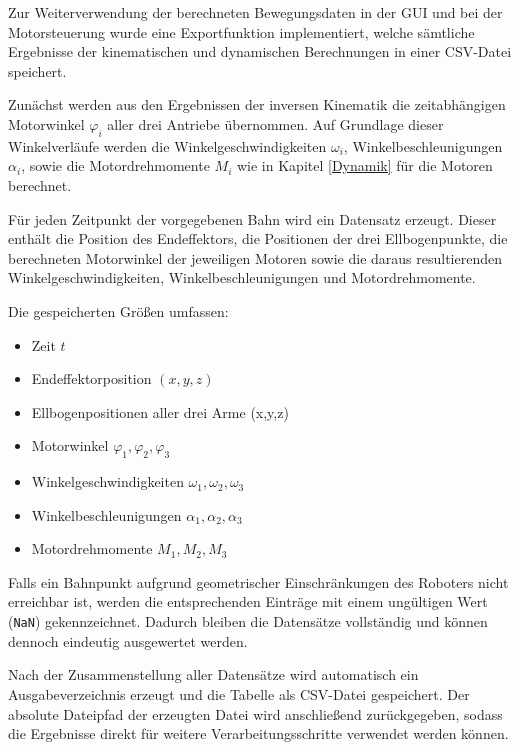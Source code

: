 Zur Weiterverwendung der berechneten Bewegungsdaten in der GUI und bei der Motorsteuerung wurde eine Exportfunktion implementiert, welche sämtliche Ergebnisse der kinematischen und dynamischen Berechnungen in einer CSV-Datei speichert.

Zunächst werden aus den Ergebnissen der inversen Kinematik die zeitabhängigen Motorwinkel $\varphi_i$ aller drei Antriebe übernommen. Auf Grundlage dieser Winkelverläufe werden die Winkelgeschwindigkeiten $\omega_i$, Winkelbeschleunigungen $\alpha_i$, sowie die Motordrehmomente \(M_i\) wie in Kapitel \ref{Dynamik} für die Motoren berechnet.


Für jeden Zeitpunkt der vorgegebenen Bahn wird ein Datensatz erzeugt. Dieser enthält die Position des Endeffektors, die Positionen der drei Ellbogenpunkte, die berechneten Motorwinkel der jeweiligen Motoren sowie die daraus resultierenden Winkelgeschwindigkeiten, Winkelbeschleunigungen und Motordrehmomente.

Die gespeicherten Größen umfassen:

\begin{itemize}
    \item Zeit $t$
    \item Endeffektorposition $(x,y,z)$
    \item Ellbogenpositionen aller drei Arme (x,y,z)
    \item Motorwinkel $\varphi_1,\varphi_2,\varphi_3$
    \item Winkelgeschwindigkeiten $\omega_1,\omega_2,\omega_3$
    \item Winkelbeschleunigungen $\alpha_1,\alpha_2,\alpha_3$
    \item Motordrehmomente $M_1,M_2,M_3$
\end{itemize}

Falls ein Bahnpunkt aufgrund geometrischer Einschränkungen des Roboters nicht erreichbar ist, werden die entsprechenden Einträge mit einem ungültigen Wert (\texttt{NaN}) gekennzeichnet. Dadurch bleiben die Datensätze vollständig und können dennoch eindeutig ausgewertet werden.

Nach der Zusammenstellung aller Datensätze wird automatisch ein Ausgabeverzeichnis erzeugt und die Tabelle als CSV-Datei gespeichert. Der absolute Dateipfad der erzeugten Datei wird anschließend zurückgegeben, sodass die Ergebnisse direkt für weitere Verarbeitungsschritte verwendet werden können.